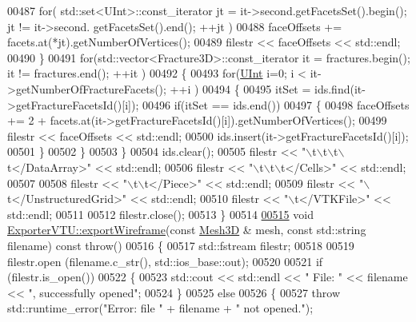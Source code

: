 \begin{DoxyCode}
00487         \textcolor{keywordflow}{for}( std::set<UInt>::const\_iterator jt = it->second.getFacetsSet().begin(); jt != it->second.
      getFacetsSet().end(); ++jt )
00488             faceOffsets += facets.at(*jt).getNumberOfVertices();
00489         filestr << faceOffsets << std::endl;
00490     \}
00491     \textcolor{keywordflow}{for}(std::vector<Fracture3D>::const\_iterator it = fractures.begin(); it != fractures.end(); ++it )
00492     \{
00493         \textcolor{keywordflow}{for}(\hyperlink{namespaceFVCode3D_a4bf7e328c75d0fd504050d040ebe9eda}{UInt} i=0; i < it->getNumberOfFractureFacets(); ++i )
00494         \{
00495             itSet = ids.find(it->getFractureFacetsId()[i]);
00496             \textcolor{keywordflow}{if}(itSet == ids.end())
00497             \{
00498                 faceOffsets += 2 + facets.at(it->getFractureFacetsId()[i]).getNumberOfVertices();
00499                 filestr << faceOffsets << std::endl;
00500                 ids.insert(it->getFractureFacetsId()[i]);
00501             \}
00502         \}
00503     \}
00504     ids.clear();
00505     filestr << \textcolor{stringliteral}{"\(\backslash\)t\(\backslash\)t\(\backslash\)t\(\backslash\)t</DataArray>"} << std::endl;
00506     filestr << \textcolor{stringliteral}{"\(\backslash\)t\(\backslash\)t\(\backslash\)t</Cells>"} << std::endl;
00507 
00508     filestr << \textcolor{stringliteral}{"\(\backslash\)t\(\backslash\)t</Piece>"} << std::endl;
00509     filestr << \textcolor{stringliteral}{"\(\backslash\)t</UnstructuredGrid>"} << std::endl;
00510     filestr << \textcolor{stringliteral}{"\(\backslash\)t</VTKFile>"} << std::endl;
00511 
00512     filestr.close();
00513 \}
00514 
\hypertarget{ExportVTU_8cpp_source.tex_l00515}{}\hyperlink{classFVCode3D_1_1ExporterVTU_a672c00cd380554714d09d5d9b0b56a24}{00515} \textcolor{keywordtype}{void} \hyperlink{classFVCode3D_1_1ExporterVTU_a672c00cd380554714d09d5d9b0b56a24}{ExporterVTU::exportWireframe}(\textcolor{keyword}{const} \hyperlink{classFVCode3D_1_1Mesh3D}{Mesh3D} & mesh, \textcolor{keyword}{const} std::string 
      filename) \textcolor{keyword}{const} \textcolor{keywordflow}{throw}()
00516 \{
00517     std::fstream filestr;
00518 
00519     filestr.open (filename.c\_str(), std::ios\_base::out);
00520 
00521     \textcolor{keywordflow}{if} (filestr.is\_open())
00522     \{
00523         std::cout << std::endl << \textcolor{stringliteral}{" File: "} << filename << \textcolor{stringliteral}{", successfully opened"};
00524     \}
00525     \textcolor{keywordflow}{else}
00526     \{
00527         \textcolor{keywordflow}{throw} std::runtime\_error(\textcolor{stringliteral}{"Error: file "} + filename + \textcolor{stringliteral}{" not opened."});

\end{DoxyCode}
